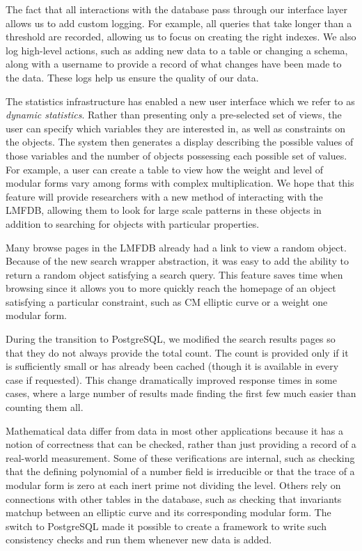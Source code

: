 \documentclass{amsart}
\begin{document}
The fact that all interactions with the database pass through our interface layer allows us to add custom logging.
For example, all queries that take longer than a threshold are recorded, allowing us to focus on creating the right indexes.
We also log high-level actions, such as adding new data to a table or changing a schema, along with a username to provide a record of what changes have been made to the data.
These logs help us ensure the quality of our data.

The statistics infrastructure has enabled a new user interface which we refer to as \emph{dynamic statistics}.
Rather than presenting only a pre-selected set of views, the user can specify which variables they are interested in, as well as constraints on the objects.
The system then generates a display describing the possible values of those variables and the number of objects possessing each possible set of values.
For example, a user can create a table to view how the weight and level of modular forms vary among forms with complex multiplication.
We hope that this feature will provide researchers with a new method of interacting with the LMFDB, allowing them to look for large scale patterns in these objects in addition to searching for objects with particular properties.

Many browse pages in the LMFDB already had a link to view a random object.
Because of the new search wrapper abstraction, it was easy to add the ability to return a random object satisfying a search query.
This feature saves time when browsing since it allows you to more quickly reach the homepage of an object satisfying a particular constraint, such as CM elliptic curve or a weight one modular form.

During the transition to PostgreSQL, we modified the search results pages so that they do not always provide the total count.
The count is provided only if it is sufficiently small or has already been cached (though it is available in every case if requested).
This change dramatically improved response times in some cases, where a large number of results made finding the first few much easier than counting them all.

Mathematical data differ from data in most other applications because it has a notion of correctness that can be checked, rather than just providing a record of a real-world measurement.
Some of these verifications are internal, such as checking that the defining polynomial of a number field is irreducible or that the trace of a modular form is zero at each inert prime not dividing the level.
Others rely on connections with other tables in the database, such as checking that invariants matchup between an elliptic curve and its corresponding modular form.
The switch to PostgreSQL made it possible to create a framework to write such consistency checks and run them whenever new data is added.


\end{document}
